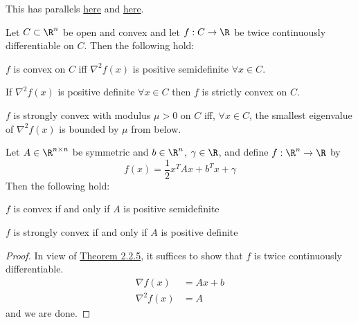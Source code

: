 This has parallels \href{a114065}{here} and \href{cd9cea7}{here}.

\label{eeb9c30}

Let $C\subset\R^n$ be open and convex and let $f:C\to\R$ be twice continuously
differentiable on $C$. Then the following hold:
\begin{enumerata}
  \def\allx{\forall x\in C}
  \def\hessian{\nabla^2f(x)}
  \item $f$ is convex on $C$ iff $\hessian$ is positive
  semidefinite $\allx$.
  \item If $\hessian$ is positive definite $\allx$ then $f$ is strictly convex on $C$.
  \item $f$ is strongly convex with modulus $\mu>0$ on $C$ iff,
  $\allx$, the smallest eigenvalue of $\hessian$ is bounded by $\mu$
  from below.
\end{enumerata}

\label{de25005}

Let $A\in\R^{n\times n}$ be symmetric and $b\in\R^n$, $\gamma\in\R$, and define
$f:\R^n\to\R$ by
$$
  f(x)=\frac12x^TAx+b^Tx+\gamma
$$
Then the following hold:
\begin{enumerata}
  \item $f$ is convex if and only if $A$ is positive semidefinite
  \item $f$ is strongly convex if and only if $A$ is positive definite
\end{enumerata}

\begin{proof}

  In view of \href{eeb9c30}{Theorem 2.2.5}, it suffices to show that $f$ is twice
  continuously differentiable.
  \begin{align*}
    \nabla f(x)  & = Ax + b \\
    \nabla^2f(x) & = A
  \end{align*}
  and we are done.
\end{proof}

\label{f546fc9}

